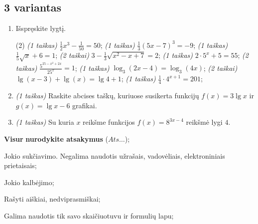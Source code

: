 \documentclass[a4paper]{article}
\begin{document}
\vspace*{12mm}

\subsection*{3 variantas}

\begin{enumerate}
      \item Išspręskite lygtį.
            \begin{tasks}[item-format={\normalfont}, after-item-skip=2mm](2)
                  \task \textit{(1 taškas)} $\frac{1}{2}x^3-\frac{1}{50}=50$;
                  \task \textit{(1 taškas)} $\frac{1}{3}(5x-7)^3=-9$;
                  \task \textit{(1 taškas)} $\frac{1}{5}\sqrt{x}+6=1$;
                  \task \textit{(2 taškai)} $3-\frac{1}{3}\sqrt{x^2-x+7}=2$;
                  \task \textit{(1 taškas)} $2\cdot5^x+5=55$;
                  \task \textit{(2 taškas)} $\frac{5^{25-x^2+2x}}{25^x}=1$;
                  \task \textit{(1 taškas)} $\log_3(2x-4)=\log_3(4x)$;
                  \task \textit{(2 taškai)} $\lg(x-3)+\lg(x)=\lg4+1$;
                  \task \textit{(1 taškas)} $\frac{1}{4}\cdot 4^{x+1}=201$;
            \end{tasks}

      \item \textit{(1 taškas)} Raskite abcises taškų, kuriuose susikerta funkcijų $f(x)=3\lg{x}$ ir $g(x)=\lg{x}-6$ grafikai.
      \item \textit{(1 taškas)} Su kuria $x$ reikšme funkcijos $f(x)=8^{3x-4}$ reikšmė lygi $4$.

\end{enumerate}

\begin{small}
      \begin{enumerate*}[label={(\arabic*)}]
            \item \textbf{Visur} \textbf{nurodykite atsakymus} ($Ats\ldots$);
            \item Jokio sukčiavimo. Negalima naudotis užrašais, vadovėliais,
            elektroniniais prietaisais;
            \item Jokio kalbėjimo;
            \item Rašyti aiškiai, nedviprasmiškai;
            \item Galima naudotis tik savo skaičiuotuvu ir formulių lapu;
      \end{enumerate*}
\end{small}
\end{document}
